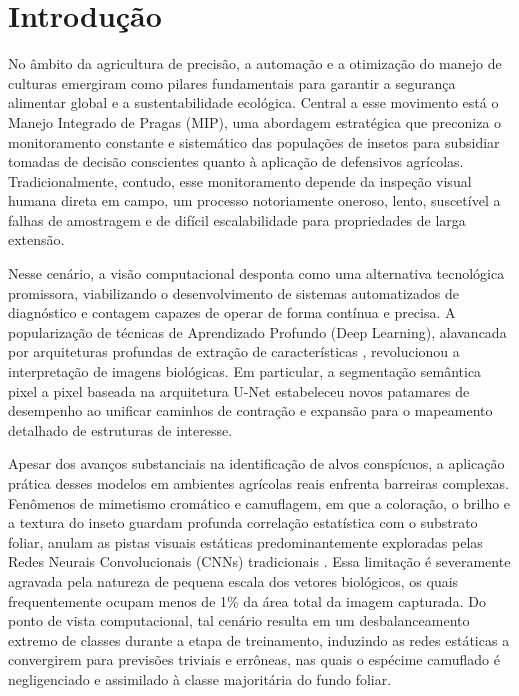 
\chapter{Introdução}\label{cap:introducao}

No âmbito da agricultura de precisão, a automação e a otimização do manejo de culturas emergiram como pilares fundamentais para garantir a segurança alimentar global e a sustentabilidade ecológica. Central a esse movimento está o Manejo Integrado de Pragas (MIP), uma abordagem estratégica que preconiza o monitoramento constante e sistemático das populações de insetos para subsidiar tomadas de decisão conscientes quanto à aplicação de defensivos agrícolas. Tradicionalmente, contudo, esse monitoramento depende da inspeção visual humana direta em campo, um processo notoriamente oneroso, lento, suscetível a falhas de amostragem e de difícil escalabilidade para propriedades de larga extensão\cite{NGUGI202127}.


Nesse cenário, a visão computacional desponta como uma alternativa tecnológica promissora, viabilizando o desenvolvimento de sistemas automatizados de diagnóstico e contagem capazes de operar de forma contínua e precisa. A popularização de técnicas de Aprendizado Profundo (Deep Learning), alavancada por arquiteturas profundas de extração de características \cite{he2016residual}, revolucionou a interpretação de imagens biológicas. Em particular, a segmentação semântica pixel a pixel baseada na arquitetura U-Net \cite{RONNEBERGER} estabeleceu novos patamares de desempenho ao unificar caminhos de contração e expansão para o mapeamento detalhado de estruturas de interesse.

Apesar dos avanços substanciais na identificação de alvos conspícuos, a aplicação prática desses modelos em ambientes agrícolas reais enfrenta barreiras complexas. Fenômenos de mimetismo cromático e camuflagem, em que a coloração, o brilho e a textura do inseto guardam profunda correlação estatística com o substrato foliar, anulam as pistas visuais estáticas predominantemente exploradas pelas Redes Neurais Convolucionais (CNNs) tradicionais \cite{Fan_2020_CVPR}. Essa limitação é severamente agravada pela natureza de pequena escala dos vetores biológicos, os quais frequentemente ocupam menos de 1\% da área total da imagem capturada. Do ponto de vista computacional, tal cenário resulta em um desbalanceamento extremo de classes durante a etapa de treinamento, induzindo as redes estáticas a convergirem para previsões triviais e errôneas, nas quais o espécime camuflado é negligenciado e assimilado à classe majoritária do fundo foliar.

